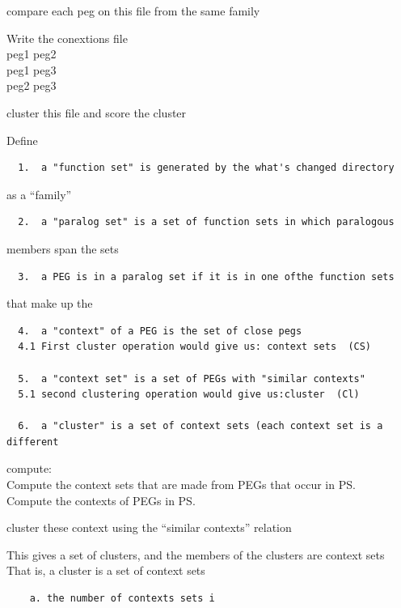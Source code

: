 \documentclass[12pt,twoside]{reedthesis}
\begin{document}
  compare each peg on this file from the same family
  
  Write the conextions file\\
  peg1 peg2\\
  peg1 peg3\\
  peg2 peg3
  
  cluster this file and score the cluster
  
  Define
  
  \begin{verbatim}
  1.  a "function set" is generated by the what's changed directory  
  \end{verbatim}
  
  as a ``family''
  
  \begin{verbatim}
  2.  a "paralog set" is a set of function sets in which paralogous  
  \end{verbatim}
  
  members span the sets
  
  \begin{verbatim}
  3.  a PEG is in a paralog set if it is in one ofthe function sets  
  \end{verbatim}
  
  that make up the
  
  \begin{verbatim}
  4.  a "context" of a PEG is the set of close pegs  
  4.1 First cluster operation would give us: context sets  (CS)  
  
  5.  a "context set" is a set of PEGs with "similar contexts"  
  5.1 second clustering operation would give us:cluster  (Cl)  
  
  6.  a "cluster" is a set of context sets (each context set is a different   
  \end{verbatim}
  
  compute:\\
   Compute the context sets that are made from PEGs that occur in PS.\\
   Compute the contexts of PEGs in PS.
  
  cluster these context using the ``similar contexts'' relation
  
  This gives a set of clusters, and the members of the clusters are
  context sets\\
  That is, a cluster is a set of context sets
  
  \begin{verbatim}
    a. the number of contexts sets i  
  \end{verbatim}
  
\end{document}
